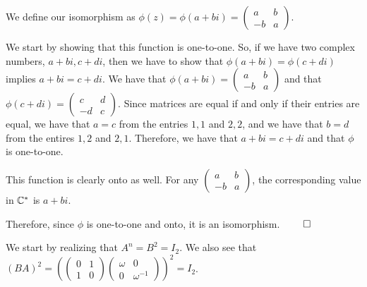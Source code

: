 \documentclass[12pt]{report}
\begin{document}
\sol

We define our isomorphism as $\phi(z) = \phi(a+bi) = \begin{pmatrix}
a & b \\
-b & a
\end{pmatrix}$. 

We start by showing that this function is one-to-one. So, if we have two complex numbers, $a+bi, c+di$, then we have to show that $\phi(a+bi) = \phi(c+di)$ implies $a+bi = c+di$. We have that $\phi(a+bi) = \begin{pmatrix}
    a & b \\
    -b & a
\end{pmatrix}$ and that $\phi(c+di) = \begin{pmatrix}
    c & d \\
    -d & c
\end{pmatrix}$. Since matrices are equal if and only if their entries are equal, we have that $a = c$ from the entries $1, 1$ and $2, 2$, and we have that $b = d$ from the entires $1, 2$ and $2, 1$. Therefore, we have that $a+bi = c+di$ and that $\phi$ is one-to-one. 

This function is clearly onto as well. For any $\begin{pmatrix}
    a & b \\
    -b & a
\end{pmatrix}$, the corresponding value in $\CC^*$ is $a+bi$.

Therefore, since $\phi$ is one-to-one and onto, it is an isomorphism. $\qed$

\sol We start by realizing that $A^n = B^2 = I_2$. We also see that $(BA)^2 =  \left(\begin{pmatrix}
        0 & 1 \\
        1 & 0
        \end{pmatrix}\begin{pmatrix}
            \omega & 0 \\
            0 & \omega^{-1}
            \end{pmatrix}\right)^2 = I_2$. 
\end{document}
